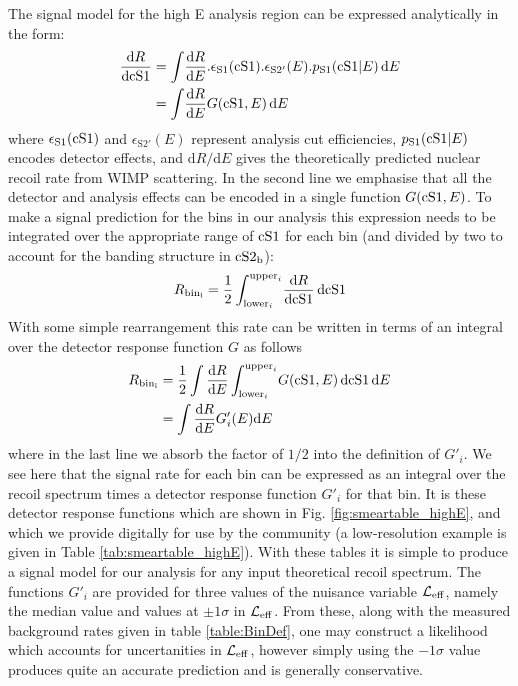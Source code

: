 The signal model for the high E analysis region can be expressed analytically in the form:
%
\begin{align}
\label{eq:high2D}
  \frac{\mathrm{d} R}{\mathrm{d}\mathrm{cS1}} &= \int \! \frac{\mathrm{d}R}{\mathrm{d}E}.\epsilon_\mathrm{S1}(\mathrm{cS1}) .\epsilon_\mathrm{S2'}(E).p_\mathrm{S1}(\mathrm{\mathrm{cS1}}|E) \, \mathrm{d}E \\
  &= \int \! \frac{\mathrm{d}R}{\mathrm{d}E} G(\mathrm{cS1},E) \, \mathrm{d}E
\end{align}
%
where $\epsilon_\mathrm{S1}(\mathrm{cS1})$ and $\epsilon_\mathrm{S2'}(E)$ represent analysis cut efficiencies, $p_\mathrm{S1}(\mathrm{\mathrm{cS1}}|E)$ encodes detector effects, and $\mathrm{d}R/\mathrm{d}E$ gives the theoretically predicted nuclear recoil rate from WIMP scattering. In the second line we emphasise that all the detector and analysis effects can be encoded in a single function $G(\mathrm{cS1},E)$. To make a signal prediction for the bins in our analysis this expression needs to be integrated over the appropriate range of $\mathrm{cS1}$ for each bin (and divided by two to account for the banding structure in $\mathrm{cS2}_\mathrm{b}$):
%
\begin{equation}
  R_\mathrm{bin_i} = \frac{1}{2}\int_{\mathrm{lower}_i}^{\mathrm{upper}_i} \! \frac{\mathrm{d} R}{\mathrm{d}\mathrm{cS1}} \, \mathrm{d}\mathrm{cS1}
\end{equation}
%
With some simple rearrangement this rate can be written in terms of an integral over the detector response function $G$ as follows
%
\begin{align}
  R_\mathrm{bin_i} &= \frac{1}{2}\int\frac{\mathrm{d} R}{\mathrm{d}E}\int_{\mathrm{lower}_i}^{\mathrm{upper}_i} \! G(\mathrm{cS1},E) \, \mathrm{d}\mathrm{cS1} \, \mathrm{d}E \\
 &= \int\frac{\mathrm{d} R}{\mathrm{d}E} G'_i(E) \mathrm{d}E
\end{align}
%
where in the last line we absorb the factor of $1/2$ into the definition of $G'_i$. We see here that the signal rate for each bin can be expressed as an integral over the recoil spectrum times a detector response function $G'_i$ for that bin. It is these detector response functions which are shown in Fig. \ref{fig:smeartable_highE}, and which we provide digitally for use by the community (a low-resolution example is given in Table \ref{tab:smeartable_highE}). With these tables it is simple to produce a signal model for our analysis for any input theoretical recoil spectrum. The functions $G'_i$ are provided for three values of the nuisance variable $\mathcal{L}_{\mathrm{eff}}$, namely the median value and values at $\pm 1 \sigma$ in $\mathcal{L}_{\mathrm{eff}}$. From these, along with the measured background rates given in table \ref{table:BinDef}, one may construct a likelihood which accounts for uncertanities in $\mathcal{L}_{\mathrm{eff}}$, however simply using the $-1\sigma$ value produces quite an accurate prediction and is generally conservative.

